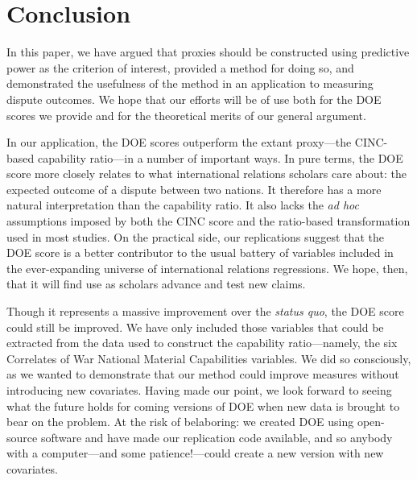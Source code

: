 \section{Conclusion}
\label{sec:conclusion}

In this paper, we have argued that proxies should be constructed using predictive power as the criterion of interest, provided a method for doing so, and demonstrated the usefulness of the method in an application to measuring dispute outcomes.
We hope that our efforts will be of use both for the DOE scores we provide and for the theoretical merits of our general argument.

In our application, the DOE scores outperform the extant proxy---the CINC-based capability ratio---in a number of important ways.
In pure terms, the DOE score more closely relates to what international relations scholars care about: the expected outcome of a dispute between two nations.
It therefore has a more natural interpretation than the capability ratio.
It also lacks the \emph{ad hoc} assumptions imposed by both the CINC score and the ratio-based transformation used in most studies.
On the practical side, our replications suggest that the DOE score is a better contributor to the usual battery of variables included in the ever-expanding universe of international relations regressions.
We hope, then, that it will find use as scholars advance and test new claims.

Though it represents a massive improvement over the \emph{status quo}, the DOE score could still be improved.
We have only included those variables that could be extracted from the data used to construct the capability ratio---namely, the six Correlates of War National Material Capabilities variables.
We did so consciously, as we wanted to demonstrate that our method could improve measures without introducing new covariates.
Having made our point, we look forward to seeing what the future holds for coming versions of DOE when new data is brought to bear on the problem.
At the risk of belaboring: we created DOE using open-source software and have made our replication code available, and so anybody with a computer---and some patience!---could create a new version with new covariates.

